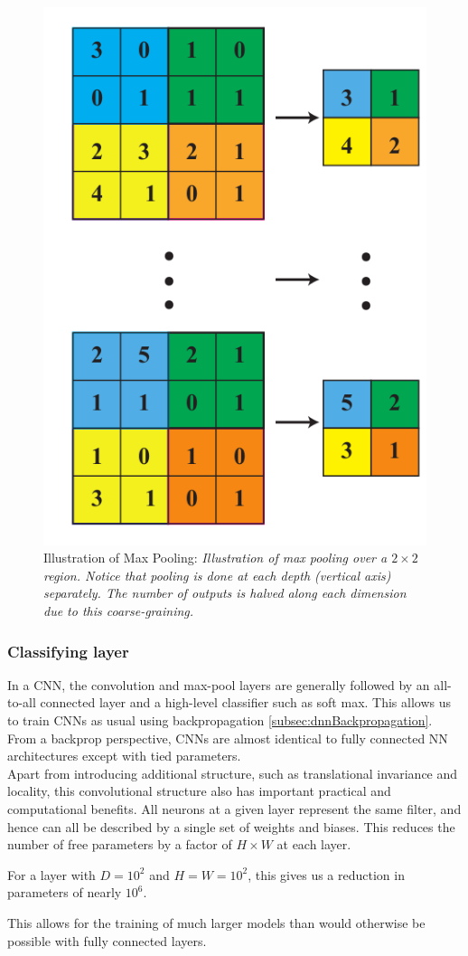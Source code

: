 \begin{figure}[h!]
	\centering
	\includegraphics[width=0.7\linewidth]{gfx/cnnPooling}
	\caption{Illustration of Max Pooling: \itshape Illustration of max pooling over a $2\times 2$ region. Notice that pooling is done at each depth (vertical axis) separately. The number of outputs is halved along each dimension due to this coarse-graining.}
	\label{fig:cnnPooling}
\end{figure}
\subsubsection{Classifying layer}
In a CNN, the convolution and max-pool layers are generally followed by an all-to-all connected layer and a high-level classifier such as soft max. This allows us to train CNNs as usual using backpropagation  \ref{subsec:dnnBackpropagation}. From a backprop perspective, CNNs are almost identical to fully connected NN architectures except with tied parameters.\\
Apart from introducing additional structure, such as translational invariance and locality, this convolutional structure also has important practical and computational benefits. All neurons at a given layer represent the same filter, and hence can all be described by a single set of weights and biases. This reduces the number of free parameters by a factor of $H\times W$ at each layer.
\begin{example}
	For a layer with $D=10^2$ and $H=W=10^2$, this gives us a reduction in parameters of nearly $10^6$.
\end{example}
This allows for the training of much larger models than would otherwise be possible with fully connected layers. 









